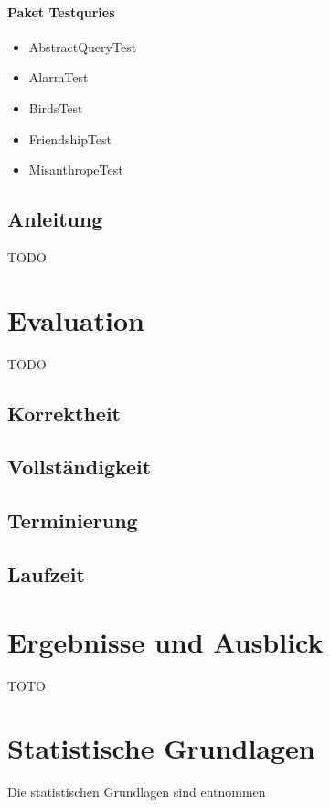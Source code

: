 \documentclass[a4paper, 11pt]{book}
\begin{document}
\subsubsection{Paket Testquries}
\begin{itemize}
	\item AbstractQueryTest
	\item AlarmTest
	\item BirdsTest
	\item FriendshipTest
	\item MisanthropeTest
	
\end{itemize}


\section{Anleitung}
TODO







\chapter{Evaluation}\label{eval} TODO
\section{Korrektheit}
\section{Vollständigkeit}
\section{Terminierung}
\section{Laufzeit}


\chapter{Ergebnisse und Ausblick}\label{Erg}TOTO





\appendix{}

\chapter{Statistische Grundlagen}
Die statistischen Grundlagen sind \cite{BKI08} entnommen
\end{document}

